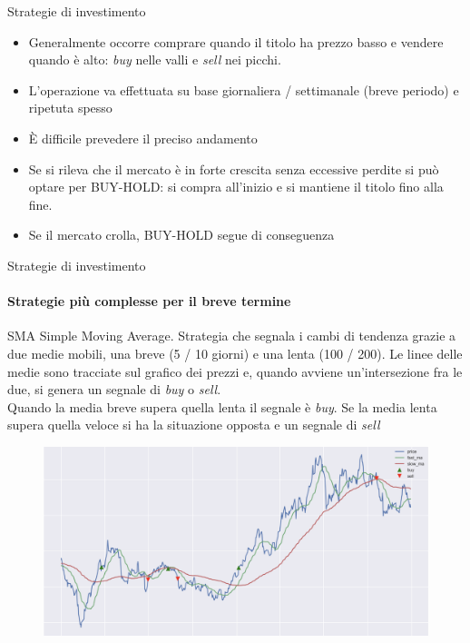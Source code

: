 \documentclass{beamer}
\begin{document}
\begin{frame}{Strategie di investimento}
\begin{itemize}
    \item Generalmente occorre comprare quando il titolo ha prezzo basso e vendere quando è alto: \textit{buy} nelle valli e \textit{sell} nei picchi. 
    \item L'operazione va effettuata su base giornaliera / settimanale (breve periodo) e ripetuta spesso
    \item È difficile prevedere il preciso andamento
    \item Se si rileva che il mercato è in forte crescita senza eccessive perdite si può optare per BUY-HOLD: si compra all'inizio e si mantiene il titolo fino alla fine.
    \item Se il mercato crolla, BUY-HOLD segue di conseguenza
    \begin{figure}
    \end{figure}
\end{itemize}
\end{frame}

\begin{frame}{Strategie di investimento}
\framesubtitle{Strategie più complesse per il breve termine}
\begin{itemize}
    \begin{block}{SMA}
    Simple Moving Average. Strategia che segnala i cambi di tendenza grazie a due medie mobili, una breve (5 / 10 giorni) e una lenta (100 / 200). Le linee delle medie sono tracciate sul grafico dei prezzi e, quando avviene un'intersezione fra le due, si genera un segnale di \textit{buy} o \textit{sell}.\\ Quando la media breve supera quella lenta il segnale è \textit{buy}. Se la media lenta supera quella veloce si ha la situazione opposta e un segnale di \textit{sell}
    \end{block}
    \begin{figure}
        \centering
        \includegraphics[width=.5\linewidth]{moving_avg2}
    \end{figure}
\end{itemize}
\end{frame}
\end{document}
